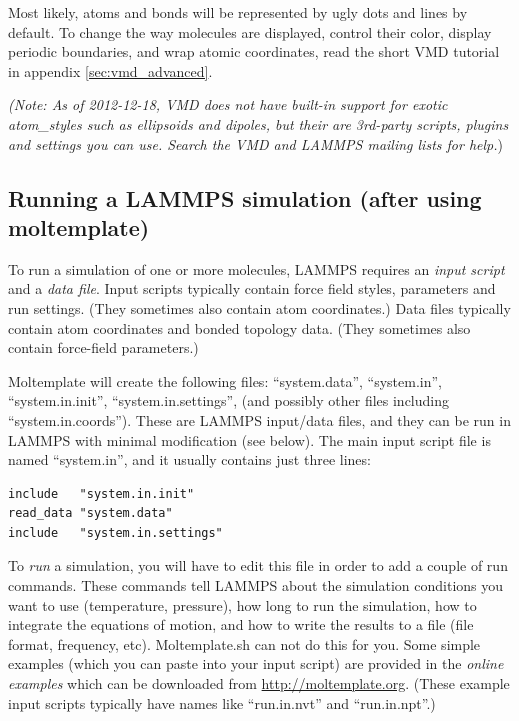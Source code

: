 \documentclass[11pt]{article}
\begin{document}
Most likely, atoms and bonds will be represented by 
ugly dots and lines by default. 
To change the way molecules are displayed, control their color, 
display periodic boundaries, and wrap atomic coordinates,  
read the short VMD tutorial in appendix \ref{sec:vmd_advanced}.

\textit{(Note:
As of 2012-12-18, 
VMD does not have built-in support for exotic atom\_styles 
such as ellipsoids and dipoles, but their are 3rd-party scripts, plugins 
and settings you can use. Search the VMD and LAMMPS mailing lists 
for help.})



\subsection{Running a LAMMPS simulation (after using moltemplate)}
\label{sec:run}
To run a simulation of one or more molecules, 
LAMMPS requires an \textit{input script} and a \textit{data file}.
Input scripts typically contain
force field styles, parameters and run settings.
(They sometimes also contain atom coordinates.)
Data files typically contain atom coordinates and bonded topology data.
(They sometimes also contain force-field parameters.)

Moltemplate will create the following files: 
``system.data'',
``system.in'',
``system.in.init'',
``system.in.settings'',
(and possibly other files including ``system.in.coords''). 
These are LAMMPS input/data files, and they can be run in LAMMPS 
with minimal modification (see below).
The main input script file is named ``system.in'', and it usually contains
just three lines:
\begin{verbatim}
include   "system.in.init"
read_data "system.data"
include   "system.in.settings"
\end{verbatim}

To \textit{run} a simulation, you will have to 
edit this file in order to add a couple of run commands.  
These commands tell LAMMPS about the simulation conditions
you want to use (temperature, pressure), 
how long to run the simulation,
how to integrate the equations of motion,
and how to write the results to a file (file format, frequency, etc).
Moltemplate.sh can not do this for you.
Some simple examples (which you can paste into your input script)
are provided in the 
\textit{online examples} 
which can be downloaded from \url{http://moltemplate.org}.
(These example input scripts 
 typically have names like ``run.in.nvt'' and ``run.in.npt''.)
\end{document}
